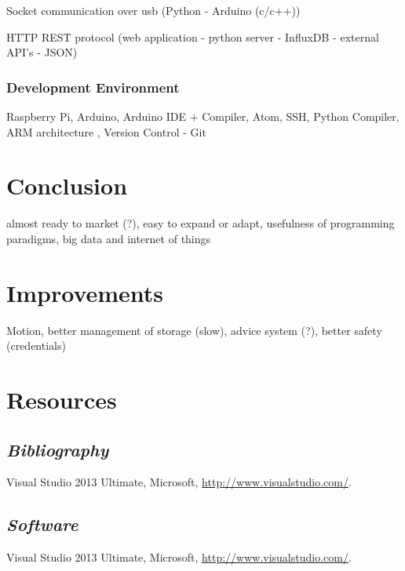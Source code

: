 \documentclass[12pt]{report}
\begin{document}
Socket communication over usb (Python - Arduino (c/c++))

HTTP REST protocol  (web application - python server - InfluxDB - external API's - JSON)

\subsection{Development Environment}

Raspberry Pi, Arduino, Arduino IDE  + Compiler, Atom, SSH, Python Compiler, ARM architecture , Version Control - Git

\newpage
\chapter{Conclusion}

almost ready to market (?), easy to expand or adapt, usefulness of programming paradigms, big data and internet of things

\newpage
\chapter{Improvements}

Motion, better management of storage (slow), advice system (?), better safety (credentials)
\newpage
\chapter{Resources}
\section{\it{Bibliography}}
\begin{description}
\item Visual Studio 2013 Ultimate, Microsoft, \url{http://www.visualstudio.com/}.
\end{description}
\section{\it{Software}}
\begin{description}
\item Visual Studio 2013 Ultimate, Microsoft, \url{http://www.visualstudio.com/}.
\end{description}

\newpage
\end{document}
